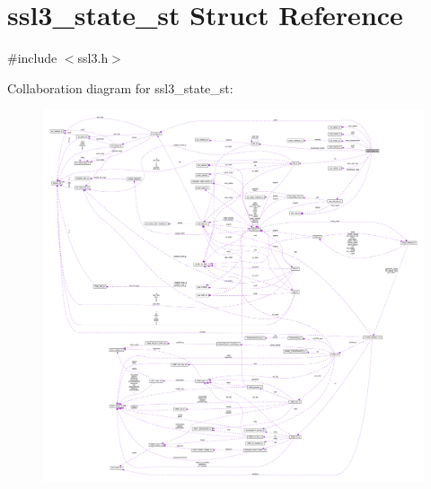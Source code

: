 \hypertarget{structssl3__state__st}{}\section{ssl3\+\_\+state\+\_\+st Struct Reference}
\label{structssl3__state__st}


{\ttfamily \#include $<$ssl3.\+h$>$}



Collaboration diagram for ssl3\+\_\+state\+\_\+st\+:\nopagebreak
\begin{figure}[H]
\begin{center}
\leavevmode
\includegraphics[width=350pt]{structssl3__state__st__coll__graph}
\end{center}
\end{figure}
